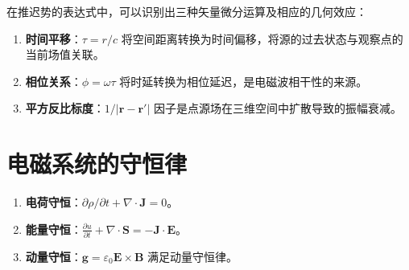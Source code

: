 \begin{property}[推迟势中三种运算的体现]\label{prop:retarded_delay_grammar}
在推迟势的表达式中，可以识别出三种矢量微分运算及相应的几何效应：
\begin{enumerate}[label=(\roman*)]
    \item \textbf{时间平移}：$\tau = r/c$ 将空间距离转换为时间偏移，将源的过去状态与观察点的当前场值关联。
    \item \textbf{相位关系}：$\phi = \omega\tau$ 将时延转换为相位延迟，是电磁波相干性的来源。
    \item \textbf{平方反比标度}：$1/|\mathbf{r}-\mathbf{r}'|$ 因子是点源场在三维空间中扩散导致的振幅衰减。
\end{enumerate}
\end{property}

\section{电磁系统的守恒律}

\begin{theorem}[电磁系统的三种守恒律]\label{thm:electromagnetic_conservation}
\begin{enumerate}[label=(\roman*)]
    \item \textbf{电荷守恒}：$\partial\rho/\partial t + \nabla \cdot \mathbf{J} = 0$。
    \item \textbf{能量守恒}：$\frac{\partial u}{\partial t} + \nabla \cdot \mathbf{S} = -\mathbf{J} \cdot \mathbf{E}$。
    \item \textbf{动量守恒}：$\mathbf{g} = \varepsilon_0 \mathbf{E} \times \mathbf{B}$ 满足动量守恒律。
\end{enumerate}
\end{theorem}

